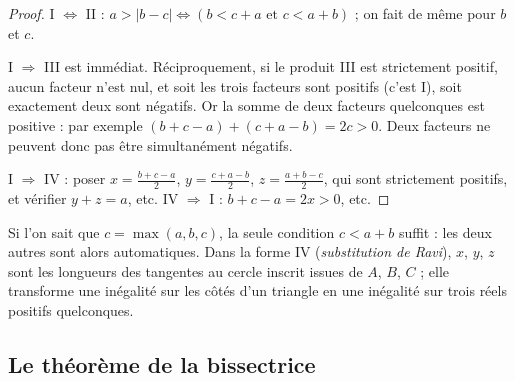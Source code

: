 \documentclass[11pt]{article}
\begin{document}
\begin{proof}
I $\Leftrightarrow$ II : $a > |b - c| \iff (b < c + a \text{ et } c < a + b)$ ;
on fait de même pour $b$ et $c$.

I $\Rightarrow$ III est immédiat. Réciproquement, si le produit III est
strictement positif, aucun facteur n'est nul, et soit les trois facteurs
sont positifs (c'est I), soit exactement deux sont négatifs. Or la somme de
deux facteurs quelconques est positive : par exemple
$(b + c - a) + (c + a - b) = 2c > 0$. Deux facteurs ne peuvent donc pas être
simultanément négatifs.

I $\Rightarrow$ IV : poser $x = \frac{b + c - a}{2}$, $y = \frac{c + a - b}{2}$,
$z = \frac{a + b - c}{2}$, qui sont strictement positifs, et vérifier
$y + z = a$, etc. IV $\Rightarrow$ I : $b + c - a = 2x > 0$, etc.
\end{proof}

\begin{remarque}
Si l'on sait que $c = \max(a, b, c)$, la seule condition $c < a + b$ suffit :
les deux autres sont alors automatiques. Dans la forme IV (\emph{substitution
de Ravi}), $x$, $y$, $z$ sont les longueurs des tangentes au cercle inscrit
issues de $A$, $B$, $C$ ; elle transforme une inégalité sur les côtés d'un
triangle en une inégalité sur trois réels positifs quelconques.
\end{remarque}

\begin{center}
\end{center}

\subsection*{Le théorème de la bissectrice}
\end{document}
